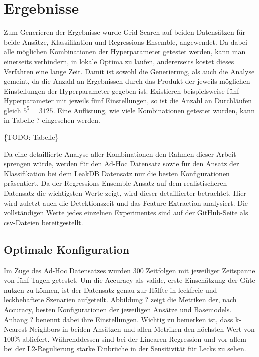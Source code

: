 \chapter{Ergebnisse}

Zum Generieren der Ergebnisse wurde Grid-Search auf beiden Datensätzen für beide Ansätze, Klassifikation und
 Regressions-Ensemble, angewendet. Da dabei alle möglichen Kombinationen der Hyperparameter getestet werden,
 kann man einerseits verhindern, in lokale Optima zu laufen, andererseits kostet dieses Verfahren eine lange
 Zeit. Damit ist sowohl die Generierung, als auch die Analyse gemeint, da die Anzahl an Ergebnissen durch das
 Produkt der jeweils möglichen Einstellungen der Hyperparameter gegeben ist. Existieren beispielsweise fünf
 Hyperparameter mit jeweils fünf Einstellungen, so ist die Anzahl an Durchläufen gleich $5^5=3125$.
 Eine Auflistung, wie viele Kombinationen getestet wurden, kann in Tabelle ? eingesehen werden.

\{TODO: Tabelle\}

Da eine detaillierte Analyse aller Kombinationen den Rahmen dieser Arbeit sprengen würde, werden für den
 Ad-Hoc Datensatz sowie für den Ansatz der Klassifikation bei dem LeakDB Datensatz nur die besten Konfigurationen
 präsentiert. Da der Regressions-Ensemble-Ansatz auf dem realistischeren Datensatz die wichtigsten Werte zeigt,
 wird dieser detaillierter betrachtet. Hier wird zuletzt auch die Detektionszeit und das Feature Extraction
 analysiert. Die vollständigen Werte jedes einzelnen Experimentes sind auf der GitHub-Seite als csv-Dateien
 bereitgestellt.

\section{Optimale Konfiguration}

Im Zuge des Ad-Hoc Datensatzes wurden 300 Zeitfolgen mit jeweiliger Zeitspanne von fünf Tagen getestet. Um die
 Accuracy als valide, erste Einschätzung der Güte nutzen zu können, ist der Datensatz genau zur Hälfte in
 leckfreie und leckbehaftete Szenarien aufgeteilt. Abbildung ? zeigt die Metriken der, nach Accuracy, besten
 Konfigurationen der jeweiligen Ansätze und Basemodels. Anhang ? benennt dabei ihre Einstellungen. Wichtig zu
 bemerken ist, dass k-Nearest Neighbors in beiden Ansätzen und allen Metriken den höchsten Wert von 100\%
 abliefert. Währenddessen sind bei der Linearen Regression und vor allem bei der L2-Regulierung starke Einbrüche
 in der Sensitivität für Lecks zu sehen.

